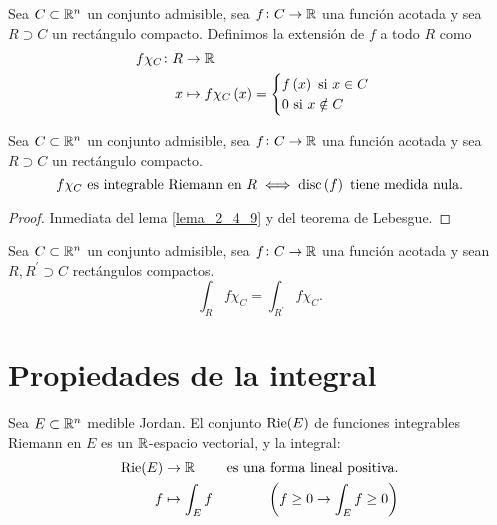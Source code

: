 \begin{defi}
    Sea $C \subset \mathbb{R}^n$ un conjunto admisible, sea $f \colon C \to \mathbb{R}$ una función acotada y sea $R \supset C$ un rectángulo compacto. Definimos la extensión de $f$ a todo $R$ como
    \begin{align*}
        f \chi_C \colon R &\to \mathbb{R} \\
        x &\mapsto f \chi_C \left( x \right) = \begin{cases} f \left( x \right) \text{ si } x \in C \\ 0 \text{ si } x \notin C \end{cases}
    \end{align*}
\end{defi}

\begin{lema}
    Sea $C \subset \mathbb{R}^n$ un conjunto admisible, sea $f \colon C \to \mathbb{R}$ una función acotada y sea $R \supset C$ un rectángulo compacto.
    \[
        f \chi_C \text{ es integrable Riemann en } R \iff \operatorname{disc} \left( f \right) \text{ tiene medida nula}.
    \]
\end{lema}

\begin{proof}
    Inmediata del lema \ref{lema_2_4_9} y del teorema de Lebesgue.
\end{proof}

\begin{lema}
    Sea $C \subset \mathbb{R}^n$ un conjunto admisible, sea $f \colon C \to \mathbb{R}$ una función acotada y sean $R, R^{\prime} \supset C$ rectángulos compactos.
    \[
        \int_R f \chi_C = \int_{R^{\prime}} f \chi_C.
    \]
\end{lema}

\section{Propiedades de la integral}

\begin{prop}
    Sea $E \subset \mathbb{R}^n$ medible Jordan. El conjunto $\operatorname{Rie}(E)$ de funciones integrables Riemann en $E$ es un $\mathbb{R}$-espacio vectorial, y la integral:
    \begin{align*}
        \operatorname{Rie}(E) &\to \mathbb{R} & \text{es una forma lineal positiva.} \\
        f &\mapsto \int_E f & \left( f \geq 0 \to \int_E f \geq 0 \right)
    \end{align*}
\end{prop}

